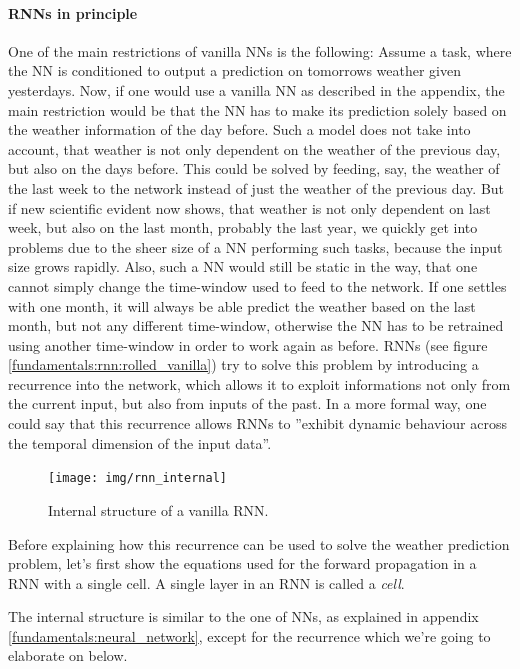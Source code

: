 \paragraph{RNNs in principle}
One of the main restrictions of vanilla NNs is the following: Assume a task, where the NN is conditioned to output a prediction on tomorrows weather given yesterdays. Now, if one would use a vanilla NN as described in the appendix, the main restriction would be that the NN has to make its prediction solely based on the weather information of the day before. Such a model does not take into account, that weather is not only dependent on the weather of the previous day, but also on the days before. This could be solved by feeding, say, the weather of the last week to the network instead of just the weather of the previous day. But if new scientific evident now shows, that weather is not only dependent on last week, but also on the last month, probably the last year, we quickly get into problems due to the sheer size of a NN performing such tasks, because the input size grows rapidly. Also, such a NN would still be static in the way, that one cannot simply change the time-window used to feed to the network. If one settles with one month, it will always be able predict the weather based on the last month, but not any different time-window, otherwise the NN has to be retrained using another time-window in order to work again as before. RNNs (see figure \ref{fundamentals:rnn:rolled_vanilla}) try to solve this problem by introducing a recurrence into the network, which allows it to exploit informations not only from the current input, but also from inputs of the past. In a more formal way, one could say that this recurrence allows RNNs to ''exhibit dynamic behaviour across the temporal dimension of the input data''.

\begin{figure}[h]
	\label{fundamentals:rnn:internal_structure}
	\centering
	\texttt{[image: img/rnn\_internal]}
	\caption{Internal structure of a vanilla RNN.\protect\footnotemark}
\end{figure}

Before explaining how this recurrence can be used to solve the weather prediction problem, let's first show the equations used for the forward propagation in a RNN with a single cell. A single layer in an RNN is called a \emph{cell}. 

The internal structure is similar to the one of NNs, as explained in appendix \ref{fundamentals:neural_network}, except for the recurrence which we're going to elaborate on below.


